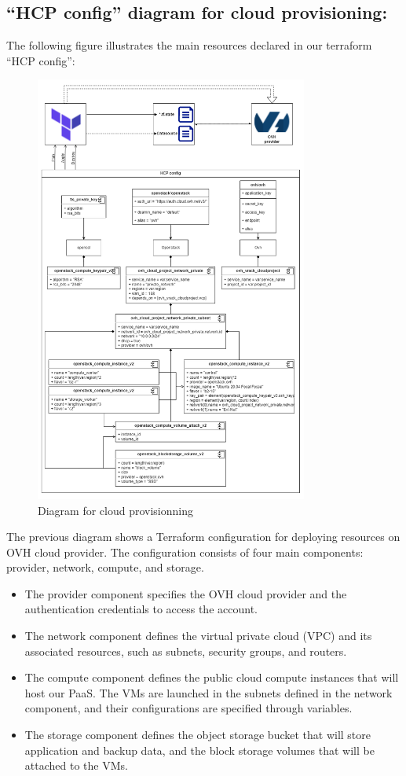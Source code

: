 \subsection{“HCP config” diagram for cloud provisioning: }
The following figure illustrates the main resources declared in our terraform “HCP config”: 

\begin{figure}[H]\centering
\includegraphics[width=0.8\textwidth]{assets/f14.png}
\caption{Diagram for cloud provisionning}
\label{fig:fig14}
\end{figure}
\newpage
The previous diagram shows a Terraform configuration for deploying resources on OVH cloud provider. The configuration consists of four main components: provider, network, compute, and storage. 

\begin{itemize}[label={--}]
\item The provider component specifies the OVH cloud provider and the authentication credentials to access the account. 
\item The network component defines the virtual private cloud (VPC) and its associated resources, such as subnets, security groups, and routers. 
\item The compute component defines the public cloud compute instances that will host our PaaS. The VMs are launched in the subnets defined in the network component, and their configurations are specified through variables. 
\item The storage component defines the object storage bucket that will store application and backup data, and the block storage volumes that will be attached to the VMs. 
\end{itemize}

